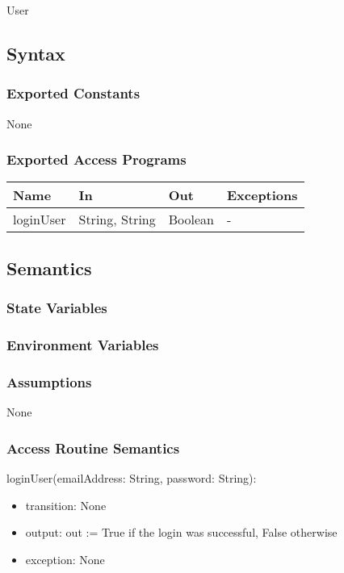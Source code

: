 \documentclass[12pt, titlepage]{article}
\begin{document}
User

\subsection{Syntax}

\subsubsection{Exported Constants}
None

\subsubsection{Exported Access Programs}

\begin{center}
\begin{tabular}{p{4cm} p{4cm} p{4cm} p{4cm}}
\hline
\textbf{Name} & \textbf{In} & \textbf{Out} & \textbf{Exceptions} \\
\hline
loginUser & String, String & Boolean & - \\
\hline
\end{tabular}
\end{center}

\subsection{Semantics}

\subsubsection{State Variables}

\subsubsection{Environment Variables}

\subsubsection{Assumptions}

None

\subsubsection{Access Routine Semantics}

\noindent loginUser(emailAddress: String, password: String):
\begin{itemize}
\item transition: None
\item output: out := True if the login was successful, False otherwise
\item exception: None
\end{itemize}
\end{document}

